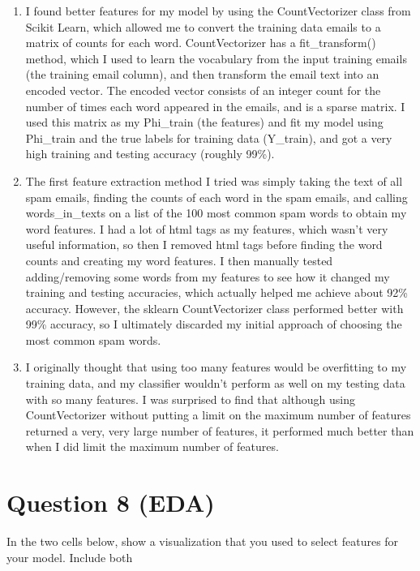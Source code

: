 \documentclass[11pt]{article}
\begin{document}
    \begin{enumerate}
\def\labelenumi{\arabic{enumi}.}
\item
  I found better features for my model by using the CountVectorizer
  class from Scikit Learn, which allowed me to convert the training data
  emails to a matrix of counts for each word. CountVectorizer has a
  fit\_transform() method, which I used to learn the vocabulary from the
  input training emails (the training email column), and then transform
  the email text into an encoded vector. The encoded vector consists of
  an integer count for the number of times each word appeared in the
  emails, and is a sparse matrix. I used this matrix as my Phi\_train
  (the features) and fit my model using Phi\_train and the true labels
  for training data (Y\_train), and got a very high training and testing
  accuracy (roughly 99\%).
\item
  The first feature extraction method I tried was simply taking the text
  of all spam emails, finding the counts of each word in the spam
  emails, and calling words\_in\_texts on a list of the 100 most common
  spam words to obtain my word features. I had a lot of html tags as my
  features, which wasn't very useful information, so then I removed html
  tags before finding the word counts and creating my word features. I
  then manually tested adding/removing some words from my features to
  see how it changed my training and testing accuracies, which actually
  helped me achieve about 92\% accuracy. However, the sklearn
  CountVectorizer class performed better with 99\% accuracy, so I
  ultimately discarded my initial approach of choosing the most common
  spam words.
\item
  I originally thought that using too many features would be overfitting
  to my training data, and my classifier wouldn't perform as well on my
  testing data with so many features. I was surprised to find that
  although using CountVectorizer without putting a limit on the maximum
  number of features returned a very, very large number of features, it
  performed much better than when I did limit the maximum number of
  features.
\end{enumerate}

    \section{Question 8 (EDA)}\label{question-8-eda}

In the two cells below, show a visualization that you used to select
features for your model. Include both
\end{document}
